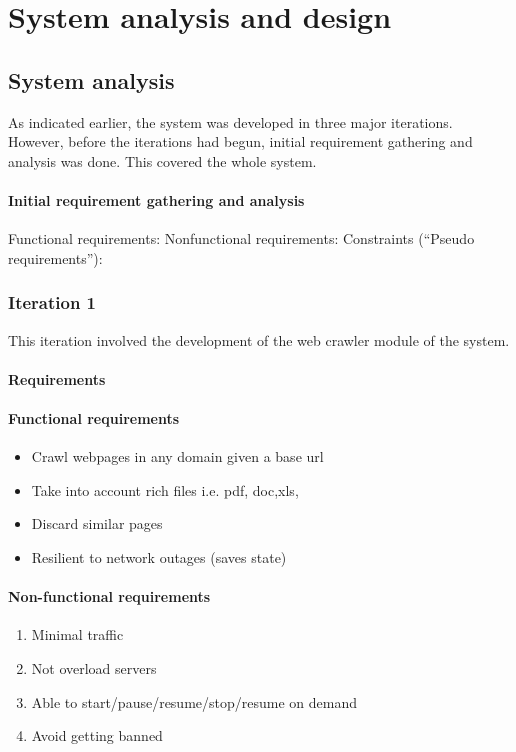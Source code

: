 \chapter{System analysis and design}
\section{System analysis}
As indicated earlier, the system was developed in three major iterations. However, before the
iterations had begun, initial requirement gathering and analysis was done. This covered the whole
system.
\subsubsection{Initial requirement gathering and analysis}
Functional requirements:
Nonfunctional requirements:
Constraints (“Pseudo requirements”):
\subsection{Iteration 1}
This iteration involved the development of the web crawler module of the system.
\subsubsection{Requirements}
\subsubsection{Functional requirements}
\begin{itemize}
\item Crawl webpages in any domain given a base url
\item Take into account rich files i.e. pdf, doc,xls,
\item Discard similar pages
\item Resilient to network outages (saves state)
\end{itemize}
\subsubsection{Non-functional requirements}
\begin{enumerate}
\item Minimal traffic
\item Not overload servers
\item Able to start/pause/resume/stop/resume on demand
\item Avoid getting banned
\end{enumerate}

